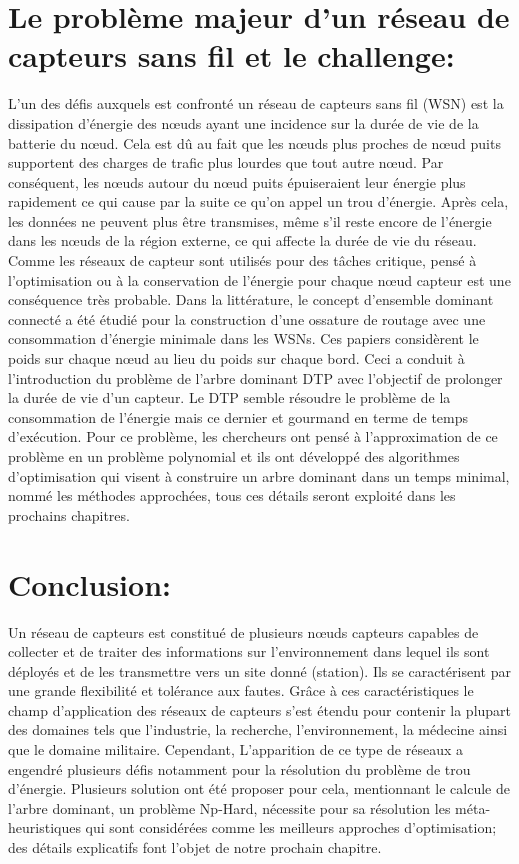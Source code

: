\section{Le problème majeur d’un réseau de capteurs sans fil et le challenge:}
L'un des défis auxquels est confronté un réseau de capteurs sans fil (WSN) est la dissipation d'énergie des nœuds ayant une incidence sur la durée de vie de la batterie du nœud. Cela est dû au fait que les nœuds plus proches de nœud puits supportent des charges de trafic plus lourdes que tout autre nœud. Par conséquent, les nœuds autour du nœud puits épuiseraient leur énergie plus rapidement ce qui cause par la suite ce qu’on appel un trou d’énergie. Après cela, les données ne peuvent plus être transmises, même s'il reste encore de l'énergie dans les nœuds de la région externe, ce qui affecte la durée de vie du réseau. Comme les réseaux de capteur sont utilisés pour des tâches critique, pensé à l’optimisation ou à la conservation de  l’énergie pour chaque nœud capteur est une conséquence très probable.
Dans la littérature, le concept d’ensemble dominant connecté \cite{guha1998approximation,park2007dominating,thai2008construction,wan2002distributed} a été étudié pour la construction d’une ossature de routage avec une consommation d’énergie minimale dans les WSNs. Ces papiers considèrent le poids sur chaque nœud au lieu du poids sur chaque bord. Ceci a conduit à l'introduction du problème de l’arbre dominant DTP \cite{shin2010approximation,zhang2008new} avec l'objectif de prolonger la durée de vie d’un capteur. \cite{sundar2014steady}
Le DTP semble résoudre le problème de la consommation de l’énergie mais ce dernier et gourmand en terme de temps d’exécution. Pour ce problème, les chercheurs ont pensé à l’approximation de ce problème en un problème polynomial et ils ont développé des algorithmes  d’optimisation qui visent à construire un arbre dominant dans un temps minimal, nommé les méthodes approchées, tous ces détails seront exploité dans les prochains chapitres.

\section{Conclusion:}
Un réseau de capteurs est constitué de plusieurs nœuds capteurs capables  de collecter et de traiter des informations sur l'environnement dans lequel ils sont déployés et de les transmettre vers un site donné (station). Ils se caractérisent par une grande flexibilité et tolérance aux fautes. Grâce à ces caractéristiques le champ d'application des réseaux de capteurs s'est étendu pour contenir la plupart des domaines tels que l’industrie, la recherche, l’environnement, la médecine ainsi que le domaine militaire. Cependant, L’apparition de ce type de réseaux a engendré plusieurs défis notamment pour la résolution du problème de trou d’énergie. Plusieurs solution ont été proposer pour cela, mentionnant le calcule de l’arbre dominant, un problème Np-Hard, nécessite pour sa résolution les méta-heuristiques qui sont considérées comme les meilleurs approches d’optimisation; des détails explicatifs font l’objet de notre prochain chapitre.


